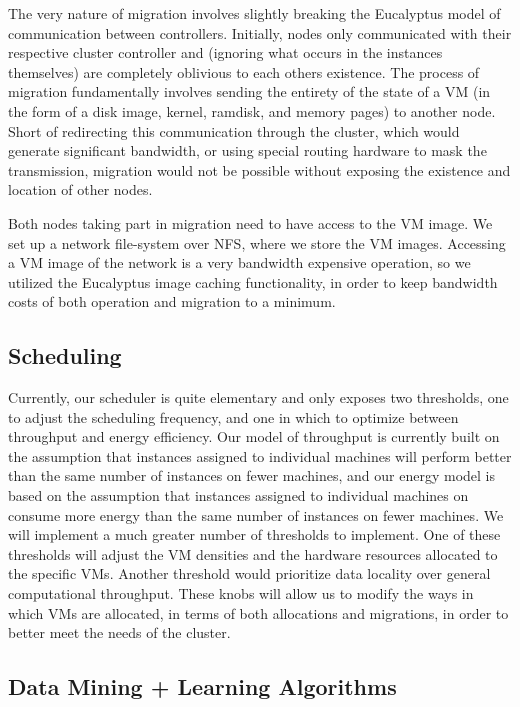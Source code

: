 The very nature of migration involves slightly breaking the Eucalyptus model of communication between controllers.  Initially, nodes only communicated with their respective cluster controller and (ignoring what occurs in the instances themselves) are completely oblivious to each others existence.  The process of migration fundamentally involves sending the entirety of the state of a VM (in the form of a disk image, kernel, ramdisk, and memory pages) to another node.  Short of redirecting this communication through the cluster, which would generate significant bandwidth, or using special routing hardware to mask the transmission, migration would not be possible without exposing the existence and location of other nodes.  

Both nodes taking part in migration need to have access to the VM image.  We set up a network file-system over NFS, where we store the VM images.  Accessing a VM image of the network is a very bandwidth expensive operation, so we utilized the Eucalyptus image caching functionality, in order to keep bandwidth costs of both operation and migration to a minimum.

\subsection{Scheduling}

Currently, our scheduler is quite elementary and only exposes two thresholds, one to adjust the scheduling frequency, and one in which to optimize between throughput and energy efficiency.  Our model of throughput is currently built on the assumption that instances assigned to individual machines will perform better than the same number of instances on fewer machines, and our energy model is based on the assumption that instances assigned to individual machines on consume more energy than the same number of instances on fewer machines.  We will implement a much greater number of thresholds to implement.  One of these thresholds will adjust the VM densities and the hardware resources allocated to the specific VMs.  Another threshold would prioritize data locality over general computational throughput.  These knobs will allow us to modify the ways in which VMs are allocated, in terms of both allocations and migrations, in order to better meet the needs of the cluster.

\subsection{Data Mining + Learning Algorithms}

